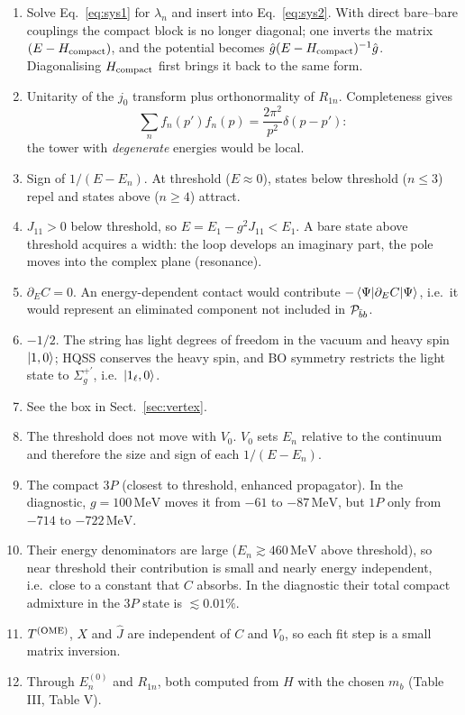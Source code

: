 \documentclass[11pt,a4paper]{article}
\renewcommand{\TOME}{T^{\rm (OME)}}
\newcommand{\Pbb}{{\cal P}_{\bar bb}}
\renewcommand{\MeV}{\,\mathrm{MeV}}
\begin{document}
\begin{enumerate}
\item Solve Eq.~\eqref{eq:sys1} for $\lambda_n$ and insert into Eq.~\eqref{eq:sys2}. With direct bare--bare couplings the compact block is no longer diagonal; one inverts the matrix $(E-H_{\rm compact})$, and the potential becomes $\hat g(E-H_{\rm compact})^{-1}\hat g$. Diagonalising $H_{\rm compact}$ first brings it back to the same form.
\item Unitarity of the $j_0$ transform plus orthonormality of $R_{1n}$. Completeness gives
\[
\sum_nf_n(p')f_n(p)=\frac{2\pi^2}{p^2}\delta(p-p'):
\]
the tower with \emph{degenerate} energies would be local.
\item Sign of $1/(E-E_n)$. At threshold ($E\approx0$), states below threshold ($n\le3$) repel and states above ($n\ge4$) attract.
\item $J_{11}>0$ below threshold, so $E=E_1-g^2J_{11}<E_1$. A bare state above threshold acquires a width: the loop develops an imaginary part, the pole moves into the complex plane (resonance).
\item $\partial_EC=0$. An energy-dependent contact would contribute $-\braket{\Psi|\partial_EC|\Psi}$, i.e.\ it would represent an eliminated component not included in $\Pbb$.
\item $-1/2$. The string has light degrees of freedom in the vacuum and heavy spin $\ket{1,0}$; HQSS conserves the heavy spin, and BO symmetry restricts the light state to $\Sigma_g^{+\prime}$, i.e.\ $\ket{1_\ell,0}$.
\item See the box in Sect.~\ref{sec:vertex}.
\item The threshold does not move with $V_0$. $V_0$ sets $E_n$ relative to the continuum and therefore the size and sign of each $1/(E-E_n)$.
\item The compact $3P$ (closest to threshold, enhanced propagator). In the diagnostic, $g=100\MeV$ moves it from $-61$ to $-87\MeV$, but $1P$ only from $-714$ to $-722\MeV$.
\item Their energy denominators are large ($E_n\gtrsim460\MeV$ above threshold), so near threshold their contribution is small and nearly energy independent, i.e.\ close to a constant that $C$ absorbs. In the diagnostic their total compact admixture in the $3P$ state is $\lesssim0.01\%$.
\item $\TOME$, $X$ and $\hat J$ are independent of $C$ and $V_0$, so each fit step is a small matrix inversion.
\item Through $E_n^{(0)}$ and $R_{1n}$, both computed from $H$ with the chosen $m_b$ (Table III, Table V).

\end{enumerate}
\end{document}
